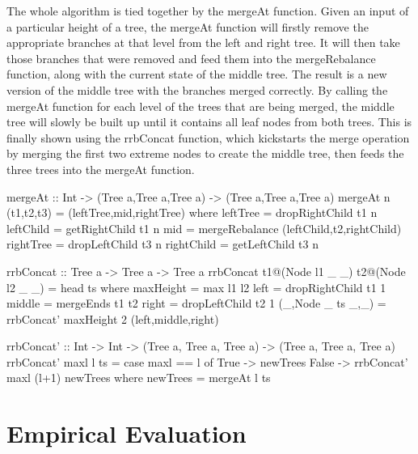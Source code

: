 \documentclass[11pt,a4paper,oneside]{article}
\begin{document}
The whole algorithm is tied together by the mergeAt function. Given an input of a particular height of a tree, the mergeAt function will firstly remove the appropriate branches at that level from the left and right tree. It will then take those branches that were removed and feed them into the mergeRebalance function, along with the current state of the middle tree. The result is a new version of the middle tree with the branches merged correctly. By calling the mergeAt function for each level of the trees that are being merged, the middle tree will slowly be built up until it contains all leaf nodes from both trees. This is finally shown using the rrbConcat function, which kickstarts the merge operation by merging the first two extreme nodes to create the middle tree, then feeds the three trees into the mergeAt function.

\begin{haskell}

mergeAt :: Int -> (Tree a,Tree a,Tree a) -> (Tree a,Tree a,Tree a)
mergeAt n (t1,t2,t3) = (leftTree,mid,rightTree)
                where leftTree   = dropRightChild t1 n
                      leftChild  = getRightChild t1 n
                      mid        = mergeRebalance (leftChild,t2,rightChild)
                      rightTree  = dropLeftChild t3 n
                      rightChild = getLeftChild t3 n
                      
rrbConcat :: Tree a -> Tree a -> Tree a
rrbConcat t1@(Node l1 _ _) t2@(Node l2 _ _) = head ts
        where maxHeight = max l1 l2
              left      = dropRightChild t1 1
              middle    = mergeEnds t1 t2
              right     = dropLeftChild t2 1
              (_,Node _ ts _,_) = rrbConcat' maxHeight 2 (left,middle,right)

rrbConcat' :: Int -> Int -> (Tree a, Tree a, Tree a) -> (Tree a, Tree a, Tree a)
rrbConcat' maxl l ts = case maxl == l of 
                       True  -> newTrees
                       False -> rrbConcat' maxl (l+1) newTrees
                    where newTrees = mergeAt l ts

\end{haskell}

\pagebreak

\section{Empirical Evaluation}
\end{document}
